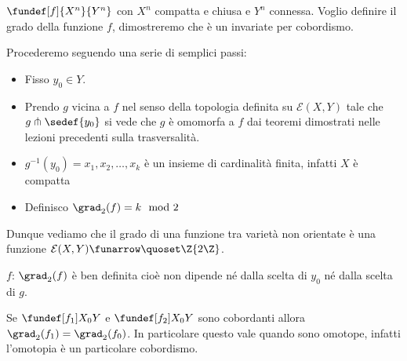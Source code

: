$\fundef[f]{X^{n}}{Y^{n}}$ con $X^{n}$ compatta e chiusa e $Y^{n}$ connessa. Voglio definire il grado della funzione $f$, dimostreremo che è un invariate per cobordismo.

\begin{defn}
Procederemo seguendo una serie di semplici passi:
\begin{itemize}
 \item Fisso $y_{0} \in Y$.
 \item Prendo $g$ vicina a $f$ nel senso della topologia definita su $\mathcal{E}(X, Y)$ tale che $g \pitchfork \sedef{y_{0}}$ si vede che $g$ è 
 omomorfa a $f$ dai teoremi dimostrati nelle lezioni precedenti sulla trasversalità.
 \item $g^{-1}(y_{0}) = {x_{1}, x_{2}, \dots, x_{k}}$ è un insieme di cardinalità finita, infatti $X$ è compatta
 \item Definisco $\grad_{2}(f) = k \mod 2$
\end{itemize}
\end{defn}

Dunque vediamo che il grado di una funzione tra varietà non orientate è una funzione $ \mathcal{E}(X, Y) \funarrow \quoset\Z{2\Z}$.

\begin{teo}
$f$: $\grad_{2}(f)$ è ben definita cioè non dipende né dalla scelta di $y_{0}$ né dalla scelta di $g$. 
\end{teo}

\begin{teo}
 Se $\fundef[f_{1}]{X_{0}}{Y}$ e $\fundef[f_{2}]{X_{0}}{Y}$ sono cobordanti allora $\grad_{2}(f_{1}) = \grad_{2}(f_{0})$. In particolare questo vale quando sono omotope,
 infatti l'omotopia è un particolare cobordismo.
\end{teo}

